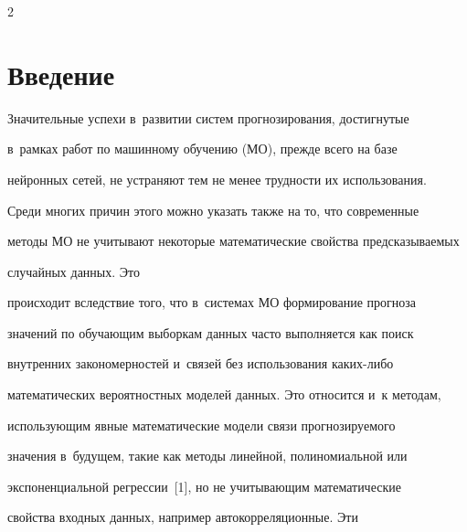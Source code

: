 




\thispagestyle{headings}





\begin{multicols}{2}





\label{st\stat}


  


  \section{Введение}





\vspace*{-2pt}


   


  Значительные успехи в~развитии систем прогнозирования, достигнутые 


в~рамках работ по машинному обучению (МО), прежде всего на базе 


нейронных сетей, не устраняют тем не менее трудности их использования. 


Среди многих причин этого можно указать также на то, что современные 


методы МО не учитывают некоторые математические свойства пред\-ска\-зы\-ва\-емых 


случайных данных. Это 


происходит вследствие того, что в~сис\-те\-мах МО формирование прогноза 


значений по обуча\-ющим выборкам данных час\-то выполняется как поиск 


внутренних закономерностей и~связей без использования ка\-ких-ли\-бо 


математических вероятностных моделей данных. Это относится и~к методам, 


использующим явные математические модели связи про\-гно\-зи\-ру\-емо\-го 


значения в~будущем, такие как методы линейной, полиномиальной или 


экспоненциальной регрессии~[1], но не учи\-ты\-ва\-ющим математические 


свойства вход\-ных данных, например автокорреляционные. Эти 



\end{multicols}
